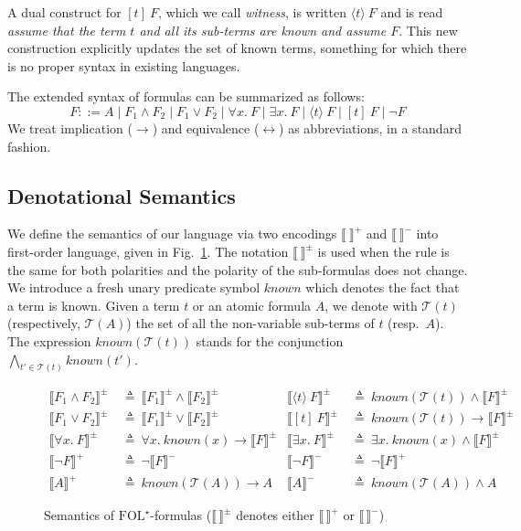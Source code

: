 \documentclass[]{easychair}
\newcommand{\terms}{\mathcal{T}}
\newcommand{\Fm}[1]{\llb #1 \rrb^-}
\newcommand{\Fp}[1]{\llb #1 \rrb^+}
\newcommand{\K}{\mathit{known}}
\newcommand{\FOLT}{\mathrm{FOL}^\star}
\newcommand{\llb}{\llbracket} \newcommand{\rrb}{\rrbracket}
\newcommand{\eqdef}{\:\triangleq\:}
\newcommand{\sep}{\;|\;}
\newcommand{\beforesub}{\vspace{0cm}}
\newcommand{\aftersub}{\vspace{0cm}}
\begin{document}
A dual construct for $[t]~F$, which we call \emph{witness}, is written
$\langle t\rangle~F$ and is read \emph{assume that the term $t$ and all
its sub-terms are known and assume $F$}.
This new construction explicitly updates the set of known terms,
something for which there is no proper syntax in existing languages.

The extended syntax of formulas can be summarized as follows:
\begin{equation*}
   F ::= A \sep F_1\land F_2 \sep F_1\lor F_2 \sep \forall x.~F \sep \exists
   x.~F \sep \langle t\rangle~F \sep [t]~F\sep\neg F
\end{equation*}
We treat implication ($\to$) and equivalence ($\leftrightarrow$) as
abbreviations, in a standard fashion.

\beforesub
\subsection{\label{semantics}Denotational Semantics}
\aftersub

We define the semantics of our language via two encodings $\Fp{~}$ and
$\Fm{~}$ into first-order language, given in Fig.~\ref{fig-sem}.
The notation $\llb~\rrb^\pm$ is used when the rule is the same for
both polarities and the polarity of the sub-formulas does not change.
We introduce a fresh unary predicate symbol $\K$ which denotes the
fact that a term is known.
Given a term $t$ or an atomic formula $A$, we denote with $\terms(t)$
(respectively, $\terms(A)$) the set of all the non-variable sub-terms of $t$
(resp.~$A$). The expression $\K(\terms(t))$ stands for the conjunction
$\bigwedge_{t'\in\terms(t)}\K(t')$.

\begin{figure}[tb]
\begin{align*}
 \llb F_1\land F_2\rrb^\pm &\eqdef \llb F_1\rrb^\pm\land \llb F_2\rrb^\pm &
 \llb \langle t\rangle~F\rrb^\pm &\eqdef \K(\terms(t))\land\llb F\rrb^\pm\\
 \llb F_1\lor F_2\rrb^\pm &\eqdef \llb F_1\rrb^\pm\lor\llb F_2\rrb^\pm &
 \llb [t]~F\rrb^\pm &\eqdef \K(\terms(t)) \to\llb F\rrb^\pm\\
 \llb \forall x.~F\rrb^\pm &\eqdef \forall x.~\K(x)\to\llb F\rrb^\pm &
 \llb \exists x.~F\rrb^\pm &\eqdef \exists x.~\K(x)\land\llb F\rrb^\pm\\
 \Fp{\neg F} &\eqdef\neg \Fm{F}& \Fm{\neg F} &\eqdef \neg \Fp{F}\\
 \Fp{A} &\eqdef \K(\terms(A))\to A &
 \Fm{A} &\eqdef \K(\terms(A))\land A
\end{align*}
\caption{\label{fig-sem}Semantics of $\FOLT$-formulas
($\llb\,\rrb^\pm$ denotes either $\Fp{\,}$ or $\Fm{\,}$)}
\end{figure}
\end{document}
